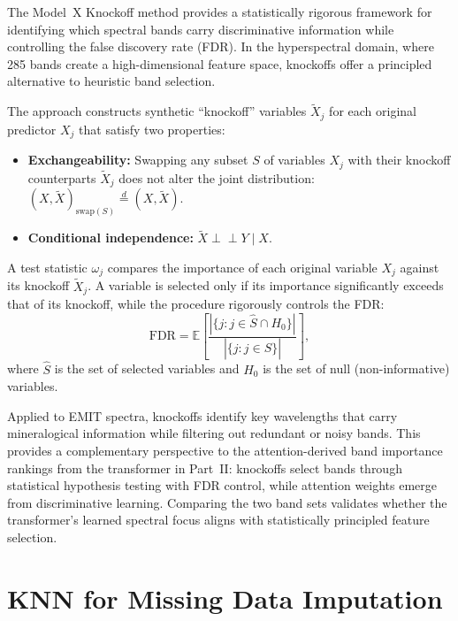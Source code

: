 \documentclass[11pt]{report}
\begin{document}
The Model~X Knockoff method \cite{candes2018} provides a statistically rigorous framework for identifying which spectral bands carry discriminative information while controlling the false discovery rate (FDR). In the hyperspectral domain, where 285 bands create a high-dimensional feature space, knockoffs offer a principled alternative to heuristic band selection.

The approach constructs synthetic ``knockoff'' variables $\tilde{X}_j$ for each original predictor $X_j$ that satisfy two properties:
\begin{itemize}
  \item \textbf{Exchangeability:} Swapping any subset $S$ of variables $X_j$ with their knockoff counterparts $\tilde{X}_j$ does not alter the joint distribution: $(X, \tilde{X})_{\text{swap}(S)} \overset{d}{=} (X, \tilde{X})$.
  \item \textbf{Conditional independence:} $\tilde{X} \perp\!\!\!\perp Y \mid X$.
\end{itemize}

A test statistic $\omega_j$ compares the importance of each original variable $X_j$ against its knockoff $\tilde{X}_j$. A variable is selected only if its importance significantly exceeds that of its knockoff, while the procedure rigorously controls the FDR:
\[
\text{FDR} = \mathbb{E} \left[ \frac{|\{j : j \in \hat{S} \cap H_0 \}|}{|\{j : j \in \hat{S} \}|} \right],
\]
where $\hat{S}$ is the set of selected variables and $H_0$ is the set of null (non-informative) variables.

Applied to EMIT spectra, knockoffs identify key wavelengths that carry mineralogical information while filtering out redundant or noisy bands. This provides a complementary perspective to the attention-derived band importance rankings from the transformer in Part~II: knockoffs select bands through statistical hypothesis testing with FDR control, while attention weights emerge from discriminative learning. Comparing the two band sets validates whether the transformer's learned spectral focus aligns with statistically principled feature selection.

\section{KNN for Missing Data Imputation}



\end{document}
